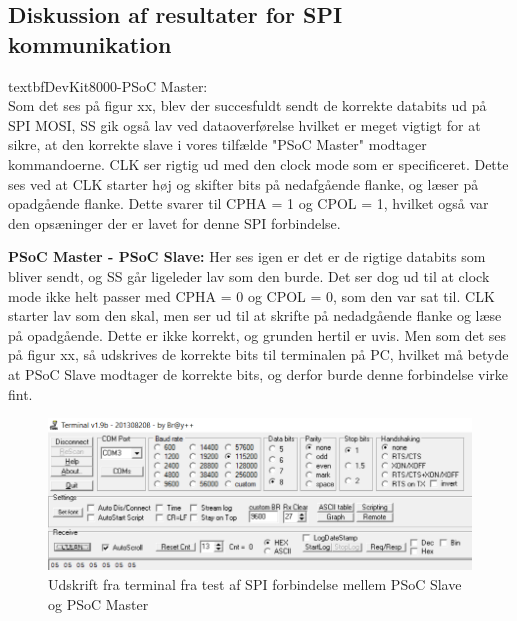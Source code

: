 \subsection{Diskussion af resultater for SPI kommunikation}
textbf{DevKit8000-PSoC Master:}\\
Som det ses på figur xx, blev der succesfuldt sendt de korrekte databits ud på SPI MOSI, SS gik også lav ved dataoverførelse hvilket er meget vigtigt
for at sikre, at den korrekte slave i vores tilfælde "PSoC Master" modtager kommandoerne. CLK ser rigtig ud med den clock mode som er specificeret.
Dette ses ved at CLK starter høj og skifter bits på nedafgående flanke, og læser på opadgående flanke. Dette svarer til CPHA = 1 og CPOL = 1, hvilket også var 
den opsæninger der er lavet for denne SPI forbindelse.

\textbf{PSoC Master - PSoC Slave:} 
Her ses igen er det er de rigtige databits som bliver sendt, og SS går ligeleder lav som den burde. Det ser dog ud til at clock mode ikke helt passer med
CPHA = 0 og CPOL = 0, som den var sat til. CLK starter lav som den skal, men ser ud til at skrifte på nedadgående flanke og læse på opadgående. Dette
er ikke korrekt, og grunden hertil er uvis. Men som det ses på figur xx, så udskrives de korrekte bits til terminalen på PC, hvilket må betyde at 
PSoC Slave modtager de korrekte bits, og derfor burde denne forbindelse virke fint.

\begin{figure}[H]
\includegraphics[scale=0.6]{tex/TeImRe/SPI/Terminal_spi_slave}
\caption{Udskrift fra terminal fra test af SPI forbindelse mellem PSoC Slave og PSoC Master}
\end{figure}
